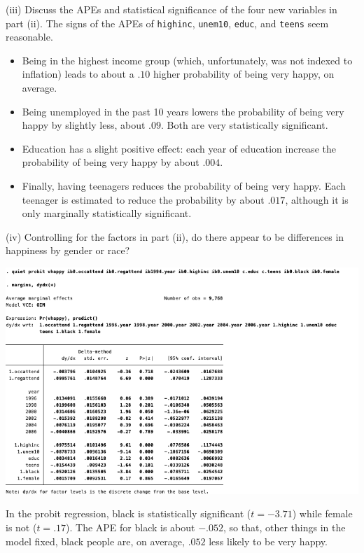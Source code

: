 \documentclass[
  10pt,
  ignorenonframetext,
]{beamer}
\begin{document}
\begin{frame}[fragile]{(iii) Discuss the APEs and statistical
significance of the four new variables in part (ii).}
\protect\hypertarget{iii-discuss-the-apes-and-statistical-significance-of-the-four-new-variables-in-part-ii.}{}
The signs of the APEs of \texttt{highinc}, \texttt{unem10},
\texttt{educ}, and \texttt{teens} seem reasonable.

\begin{itemize}
\item
  Being in the highest income group (which, unfortunately, was not
  indexed to inflation) leads to about a \(.10\) higher probability of
  being very happy, on average.
\item
  Being unemployed in the past 10 years lowers the probability of being
  very happy by slightly less, about \(.09\). Both are very
  statistically significant.
\item
  Education has a slight positive effect: each year of education
  increase the probability of being very happy by about \(.004\).
\item
  Finally, having teenagers reduces the probability of being very happy.
  Each teenager is estimated to reduce the probability by about
  \(.017\), although it is only marginally statistically significant.
\end{itemize}
\end{frame}

\begin{frame}{(iv) Controlling for the factors in part (ii), do there
appear \quad to be differences in happiness by gender or race?}
\protect\hypertarget{iv-controlling-for-the-factors-in-part-ii-do-there-appear-to-be-differences-in-happiness-by-gender-or-race}{}
\begin{center}\includegraphics[width=0.8\linewidth]{pictures/ex2-PROBIT-APE-add6ctrls} \end{center}

\footnotesize

In the probit regression, black is statistically significant
(\(t = -3.71\)) while female is not (\(t =.17\)). The APE for black is
about \(-.052\), so that, other things in the model fixed, black people
are, on average, \(.052\) less likely to be very happy.
\end{frame}
\end{document}
